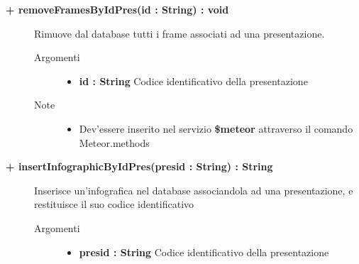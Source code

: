 \begin{description}
	\begin{description}
		\item[\textbf{\color{blue}+ removeFramesByIdPres(id : String) : void			}] \hfill
			Rimuove dal database tutti i frame associati ad una presentazione.
			
		\begin{description}
			\item[Argomenti] \hfill
				\begin{itemize}
				
					\item \textbf{id : String			} \hfill
					Codice identificativo della presentazione
					
				\end{itemize}
			\item[Note] \hfill
			\begin{itemize}
					\item Dev'essere inserito nel servizio \textbf{\$meteor} attraverso il comando Meteor.methods
				\end{itemize}
		\end{description}
	\end{description}
	
	\begin{description}
		\item[\textbf{\color{blue}+  insertInfographicByIdPres(presid : String) : String			}] \hfill
			Inserisce un'infografica nel database associandola ad una presentazione, e restituisce il suo codice identificativo
			
		\begin{description}
			\item[Argomenti] \hfill
				\begin{itemize}
				
					\item \textbf{presid : String			} \hfill
					Codice identificativo della presentazione
					

\end{itemize}
\end{description}
\end{description}
\end{description}
